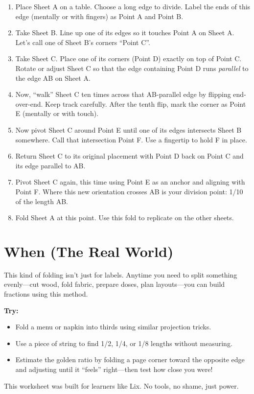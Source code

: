 \documentclass[11pt]{article}
\begin{document}
\begin{enumerate}[leftmargin=*, label=\textbf{Step \arabic*.}]
    \item Place Sheet A on a table. Choose a long edge to divide. Label the ends of this edge (mentally or with fingers) as Point A and Point B.
    
    \item Take Sheet B. Line up one of its edges so it touches Point A on Sheet A. Let’s call one of Sheet B’s corners “Point C”.

    \item Take Sheet C. Place one of its corners (Point D) exactly on top of Point C. Rotate or adjust Sheet C so that the edge containing Point D runs \textit{parallel} to the edge AB on Sheet A.

    \item Now, “walk” Sheet C ten times across that AB-parallel edge by flipping end-over-end. Keep track carefully. After the tenth flip, mark the corner as Point E (mentally or with touch).

    \item Now pivot Sheet C around Point E until one of its edges intersects Sheet B somewhere. Call that intersection Point F. Use a fingertip to hold F in place.

    \item Return Sheet C to its original placement with Point D back on Point C and its edge parallel to AB.

    \item Pivot Sheet C again, this time using Point E as an anchor and aligning with Point F. Where this new orientation crosses AB is your division point: 1/10 of the length AB.

    \item Fold Sheet A at this point. Use this fold to replicate on the other sheets.
\end{enumerate}

\section*{When (The Real World)}

This kind of folding isn’t just for labels. Anytime you need to split something evenly—cut wood, fold fabric, prepare doses, plan layouts—you can build fractions using this method.

\vspace{1em}
\textbf{Try:}
\begin{itemize}
    \item Fold a menu or napkin into thirds using similar projection tricks.
    \item Use a piece of string to find 1/2, 1/4, or 1/8 lengths without measuring.
    \item Estimate the golden ratio by folding a page corner toward the opposite edge and adjusting until it “feels” right—then test how close you were!
\end{itemize}

\vspace{1em}
This worksheet was built for learners like Lix. No tools, no shame, just power.
\end{document}
